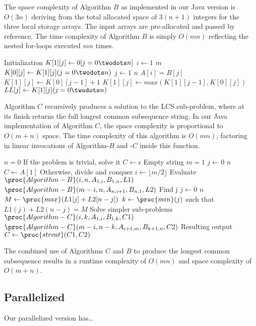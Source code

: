 The space complexity of Algorithm $B$ as implemented in our Java version is $O(3n)$ deriving from the total allocated space of $3(n+1)$ integers for the three local storage arrays. The input arrays are pre-allocated and passed by reference. The time complexity of Algorithm $B$ is simply $O(mn)$ reflecting the nested for-loops executed $mn$ times.

\begin{codebox}
\li	\Comment Initialization
\li $K[1][j] \gets 0 [j=0 \twodots n]$
\li \For $i \gets 1$ \To $m$ 
\li	\Do
\li 	$K[0][j] \gets K[1][j] (j=0\twodots n)$
\li 	\For $j \gets 1$ \To $n$ 
\li		\Do
\li			\If $A[i] = B[j]$ 
\li			\Then 
\li				$K[1][j] \gets K[0][j-1] + 1$
\li			\Else
\li				$K[1][j] \gets max(K[1][j-1], K[0][j])$
			\End
		\End
	\End
\li	$LL[j] \gets K[1][j] (j=0\twodots n)$
\end{codebox}

Algorithm $C$ recursively produces a solution to the LCS sub-problem, where at its finish returns the full longest common subsequence string. In our Java implementation of Algorithm $C$, the space complexity is proportional to $O(m + n)$ space. The time complexity of this algorithm is $O(mn)$, factoring in linear invocations of Algorithm-$B$ and -$C$ inside this function.

\begin{codebox}
\li \If $n = 0$ 
\li	\Then 
\li		\Comment If the problem is trivial, solve it
\li		$C \gets \epsilon$ \Comment Empty string
\li \ElseIf $m = 1$
\li	\Then
\li 	\For $j \gets 0$ \To $n$ 
\li     \Do
\li     	$C \gets A[1]$
\li		\End
\li \ElseNoIf
\li 	\Comment Otherwise, divide and conquer
\li 	$i \gets \lfloor m/2 \rfloor$
\li		\Comment Evaluate
\li		$\proc{Algorithm-B}(i, n, A_{1,i},  B_{1,n}, L1)$
\li		$\proc{Algorithm-B}(m-i, n, A_{n,i+1},  B_{n,1}, L2)$
\li		\Comment Find j
\li		\For $j \gets 0$ \To $n$
\li		\Do
\li			$M \gets \proc{max}(L1[j] + L2[n-j])$
\li			$k \gets \proc{min}(j)$ such that $L1(j) + L2(n-j) = M$
\li		\End
\li 	\Comment Solve simpler sub-problems
\li		$\proc{Algorithm-C}(i,k,A_{1,i}, B_{1,k}, C1)$
\li		$\proc{Algorithm-C}(m-i,n-k,A_{i+1,m}, B_{k+1,n}, C2)$
\li		\Comment Resulting output
\li		$C \gets \proc{strcat}(C1,C2)$
\li	\End
\end{codebox}

The combined use of Algorithms $C$ and $B$ to produce the longest common subsequence results in a runtime complexity of $O(mn)$ and space complexity of $O(m+n)$.

\subsection{Parallelized}
Our parallelized version has\ldots
